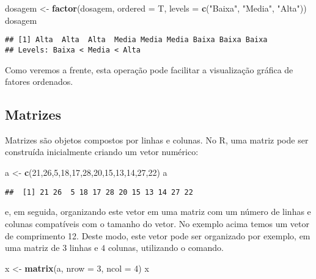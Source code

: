 \documentclass[
]{book}
\newenvironment{Shaded}{\begin{snugshade}}{\end{snugshade}}
\newcommand{\DataTypeTok}[1]{\textcolor[rgb]{0.13,0.29,0.53}{#1}}
\newcommand{\DecValTok}[1]{\textcolor[rgb]{0.00,0.00,0.81}{#1}}
\newcommand{\KeywordTok}[1]{\textcolor[rgb]{0.13,0.29,0.53}{\textbf{#1}}}
\newcommand{\NormalTok}[1]{#1}
\newcommand{\StringTok}[1]{\textcolor[rgb]{0.31,0.60,0.02}{#1}}
\begin{document}
\begin{Shaded}
\begin{Highlighting}[]
\NormalTok{dosagem <-}\StringTok{ }\KeywordTok{factor}\NormalTok{(dosagem, }\DataTypeTok{ordered =}\NormalTok{ T, }
                 \DataTypeTok{levels =} \KeywordTok{c}\NormalTok{(}\StringTok{"Baixa"}\NormalTok{, }\StringTok{"Media"}\NormalTok{, }\StringTok{"Alta"}\NormalTok{))}
\NormalTok{dosagem}
\end{Highlighting}
\end{Shaded}

\begin{verbatim}
## [1] Alta  Alta  Alta  Media Media Media Baixa Baixa Baixa
## Levels: Baixa < Media < Alta
\end{verbatim}

Como veremos a frente, esta operação pode facilitar a visualização gráfica de fatores ordenados.

\hypertarget{matrizes}{%
\subsection{Matrizes}\label{matrizes}}

Matrizes são objetos compostos por linhas e colunas. No R, uma matriz pode ser construída inicialmente criando um vetor numérico:

\begin{Shaded}
\begin{Highlighting}[]
\NormalTok{a <-}\StringTok{ }\KeywordTok{c}\NormalTok{(}\DecValTok{21}\NormalTok{,}\DecValTok{26}\NormalTok{,}\DecValTok{5}\NormalTok{,}\DecValTok{18}\NormalTok{,}\DecValTok{17}\NormalTok{,}\DecValTok{28}\NormalTok{,}\DecValTok{20}\NormalTok{,}\DecValTok{15}\NormalTok{,}\DecValTok{13}\NormalTok{,}\DecValTok{14}\NormalTok{,}\DecValTok{27}\NormalTok{,}\DecValTok{22}\NormalTok{)}
\NormalTok{a}
\end{Highlighting}
\end{Shaded}

\begin{verbatim}
##  [1] 21 26  5 18 17 28 20 15 13 14 27 22
\end{verbatim}

e, em seguida, organizando este vetor em uma matriz com um número de linhas e colunas compatíveis com o tamanho do vetor. No exemplo acima temos um vetor de comprimento 12. Deste modo, este vetor pode ser organizado por exemplo, em uma matriz de \(3\) linhas e \(4\) colunas, utilizando o comando.

\begin{Shaded}
\begin{Highlighting}[]
\NormalTok{x <-}\StringTok{ }\KeywordTok{matrix}\NormalTok{(a, }\DataTypeTok{nrow =} \DecValTok{3}\NormalTok{, }\DataTypeTok{ncol =} \DecValTok{4}\NormalTok{)}
\NormalTok{x}
\end{Highlighting}
\end{Shaded}
\end{document}
